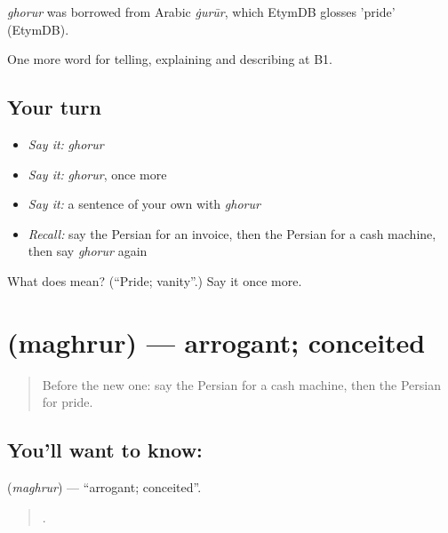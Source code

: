 \begin{cousinweb}
\emph{ghorur} was borrowed from Arabic \emph{ġurūr}, which EtymDB glosses 'pride' (EtymDB).
\end{cousinweb}

\begin{grammarlens}[title={What you've built}]
One more word for telling, explaining and describing at B1.
\end{grammarlens}

\subsection*{Your turn}
\begin{itemize}
\raggedright
  \item \emph{Say it:} \emph{ghorur}
  \item \emph{Say it:} \emph{ghorur}, once more
  \item \emph{Say it:} a sentence of your own with \emph{ghorur}
  \item \emph{Recall:} say the Persian for an invoice, then the Persian for a cash machine, then say \emph{ghorur} again
\end{itemize}

\begin{tcolorbox}[breakable,colback=teal!4,colframe=teal!35!black,title={Before you move on}]
What does  mean? (\textquotedblleft{}Pride; vanity\textquotedblright{}.) Say it once more.
\end{tcolorbox}
\section[\texorpdfstring{\fa{مغرور} (maghrur)}{مغرور (maghrur)}]{ (maghrur) — arrogant; conceited}

\label{lesson:FA-C480-maghrur}



\begin{quote}
Before the new one: say the Persian for a cash machine, then the Persian for pride.
\end{quote}

\subsection*{You'll want to know: }
\textbf{} (\emph{maghrur}) — \textquotedblleft{}arrogant; conceited\textquotedblright{}.

\begin{quote}
        .
\end{quote}

